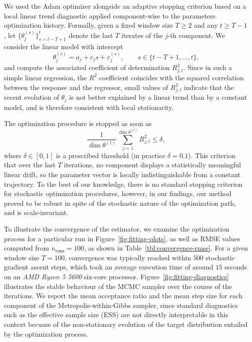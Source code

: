 \documentclass{sn-jnl}
\begin{document}
We used the Adam optimizer alongside an adaptive stopping criterion based on a local linear trend diagnostic applied component-wise to the parameters optimization history. Formally, given a fixed window size $T \geq 2$ and any $t \geq T - 1$, let $ \{ \theta_j^{(s)} \}_{s = t-T+1}^t$ denote the last $T$ iterates of the $j$-th component. We consider the linear model with intercept
\[
    \theta_j^{(s)} = a_j + c_j s + \varepsilon_j^{(s)},
    \qquad s \in \{ t-T+1, \dots, t \},
\]
and compute the associated coefficient of determination $R_{j,t}^2$. Since in such a simple linear regression, the $R^2$ coefficient coincides with the squared correlation between the response and the regressor, small values of $R_{j,t}^2$ indicate that the recent evolution of $\theta_j$ is not better explained by a linear trend than by a constant model, and is therefore consistent with local stationarity.

The optimization procedure is stopped as soon as
\[
    \frac{1}{\dim \theta^{(t)}} \sum_{j=1}^{\dim \theta^{(t)}} R_{j,t}^2 \leq \delta, \label{eq:stop}
\]
where $\delta \in [0, 1]$ is a prescribed threshold (in practice $\delta = 0.1$). This criterion that over the last $T$ iterations, no component displays a statistically meaningful linear drift, so the parameter vector is locally indistinguishable from a constant trajectory. To the best of our knowledge, there is no standard stopping criterion for stochastic optimization procedures, however, in our findings, our method proved to be robust in spite of the stochastic nature of the optimization path, and is scale-invariant. 

\bigbreak

To illustrate the convergence of the estimator, we examine the optimization process for a particular run in Figure~\ref{fig:fitting-plots}, as well as RMSE values computed from $n_\mathrm{runs} = 100$, as shown in Table~\ref{tbl:convergence-rmse}. For a given window size $T = 100$, convergence was typically reached within $500$ stochastic gradient ascent steps, which took an average execution time of around $15$ seconds on an \textit{AMD Ryzen 5 5600} six-core processor. Figure~\ref{fig:fitting-diagnostics} illustrates the stable behaviour of the MCMC sampler over the course of the iterations. We report the mean acceptance ratio and the mean step size for each component of the Metropolis-within-Gibbs sampler, since standard diagnostics such as the effective sample size (ESS) are not directly interpretable in this context becuase of the non-stationary evolution of the target distribution entailed by the optimization process.
\end{document}
